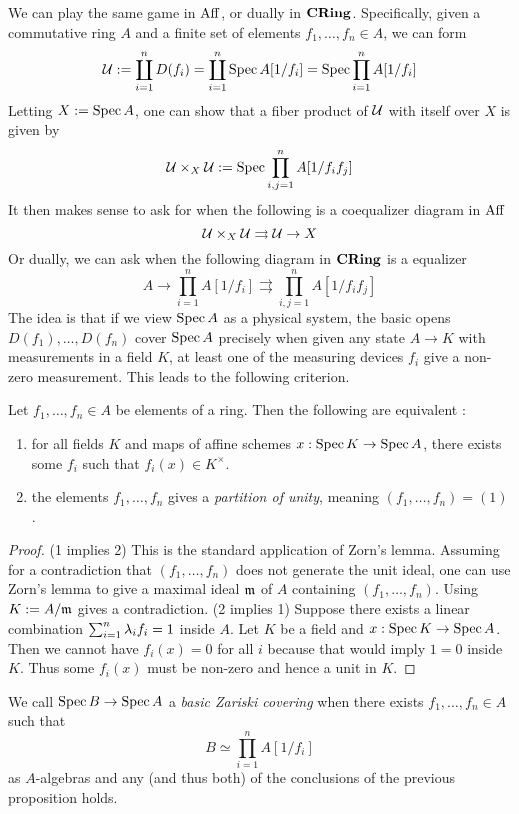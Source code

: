 \documentclass[./main.tex]{subfiles}
\begin{document}
We can play the same game in $\mathrm{Aff}$,
or dually in $\mathbf{CRing}$.
Specifically, given a commutative ring $A$
and a finite set of elements $f_1 , \dots , f_n \in A$,
we can form \[
  \mathcal{U} := \coprod_{i = 1}^{n} D(f_i) 
  = \coprod_{i = 1}^{n} \operatorname{Spec} A[1 / f_i]
  = \operatorname{Spec} \prod_{i = 1}^n A[1 / f_i]
\]
Letting $X := \operatorname{Spec} A$, one can show that 
a fiber product of $\mathcal{U}$ with itself over $X$ is given by 
\[
  \mathcal{U} \times_X \mathcal{U} := \operatorname{Spec} \prod_{i , j = 1}^n A[1 / f_i f_j]  
\]
It then makes sense to ask for when
the following is a coequalizer diagram in $\mathrm{Aff}$
\[
  \mathcal{U} \times_X \mathcal{U} \rightrightarrows \mathcal{U} \to X  
\]
Or dually, we can ask when the following diagram in $\mathbf{CRing}$
is a equalizer
\[
  A \to \prod_{i = 1}^n A[1 / f_i] \rightrightarrows 
  \prod_{i , j = 1}^n A[1 / f_i f_j]  
\]
The idea is that if we view $\operatorname{Spec} A$ as a physical system,
the basic opens $D(f_1) , \dots , D(f_n)$ cover $\operatorname{Spec} A$
precisely when given any state $A \to K$ with measurements in a field $K$,
at least one of the measuring devices $f_i$ give a non-zero measurement. 
This leads to the following criterion.
\begin{prop}
  
  Let $f_1 , \dots , f_n \in A$ be elements of a ring.
  Then the following are equivalent : 
  \begin{enumerate}
    \item for all fields $K$ and maps of affine schemes $x : \operatorname{Spec} K \to \operatorname{Spec} A$,
    there exists some $f_i$ such that $f_i(x) \in K^\times$.
    \item the elements $f_1 , \dots, f_n$ gives a \emph{partition of unity},
    meaning $(f_1 , \dots , f_n) = (1)$.
  \end{enumerate}
\end{prop}
\begin{proof}
  (1 implies 2) This is the standard application of Zorn's lemma.
  Assuming for a contradiction that $(f_1 , \dots , f_n)$ does not 
  generate the unit ideal,
  one can use Zorn's lemma to give a maximal ideal $\mathfrak{m}$ of $A$
  containing $(f_1 , \dots , f_n)$.
  Using $K := A / \mathfrak{m}$ gives a contradiction.
  (2 implies 1) Suppose there exists a linear combination 
  $\sum_{i = 1}^n \lambda_i f_i = 1$ inside $A$.
  Let $K$ be a field and $x : \operatorname{Spec} K \to \operatorname{Spec} A$.
  Then we cannot have $f_i(x) = 0$ for all $i$ because
  that would imply $1 = 0$ inside $K$.
  Thus some $f_i(x)$ must be non-zero and hence a unit in $K$.
\end{proof}
\begin{dfn}
  
  We call $\operatorname{Spec} B \to \operatorname{Spec} A$ a \emph{basic Zariski covering}
  when there exists $f_1 , \dots , f_n \in A$ such that
  \[
    B \simeq \prod_{i = 1}^n A[1 / f_i]  
  \]
  as $A$-algebras and any (and thus both)
  of the conclusions of the previous proposition holds.
\end{dfn}
\end{document}
